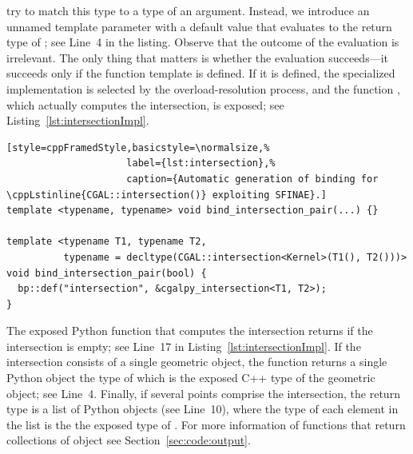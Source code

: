try to match this type to a type of an argument. Instead, we introduce
an unnamed template parameter with a default value that evaluates to
the return type of 
; see 
Line~4 in the listing. Observe that the outcome of the evaluation is
irrelevant. The only thing that matters is whether the evaluation
succeeds---it succeeds only if the function template
is defined. If it is defined, the specialized implementation is 
selected by the overload-resolution process, and the function
, 
which actually computes the intersection, is exposed; see
Listing~\ref{lst:intersectionImpl}.

\begin{lstfloat}
  \begin{lstlisting}[style=cppFramedStyle,basicstyle=\normalsize,%
                     label={lst:intersection},%
                     caption={Automatic generation of binding for \cppLstinline{CGAL::intersection()} exploiting SFINAE}.]
template <typename, typename> void bind_intersection_pair(...) {}

template <typename T1, typename T2,
          typename = decltype(CGAL::intersection<Kernel>(T1(), T2()))>
void bind_intersection_pair(bool) {
  bp::def("intersection", &cgalpy_intersection<T1, T2>);
}
  \end{lstlisting}
\end{lstfloat}

The exposed Python function that computes the intersection returns 
 if the intersection is empty; see Line~17 in
Listing~\ref{lst:intersectionImpl}. If the intersection consists of
a single geometric object, the function returns a single Python 
object the type of which is the exposed \cgal{} C++ type of
the geometric object; see Line~4. Finally, if several points 
comprise the intersection, the return type is a list of Python 
objects (see Line~10), where the type of each element in the list 
is the the exposed type of .
For more information of functions that return collections of object 
see Section~\ref{sec:code:output}.

